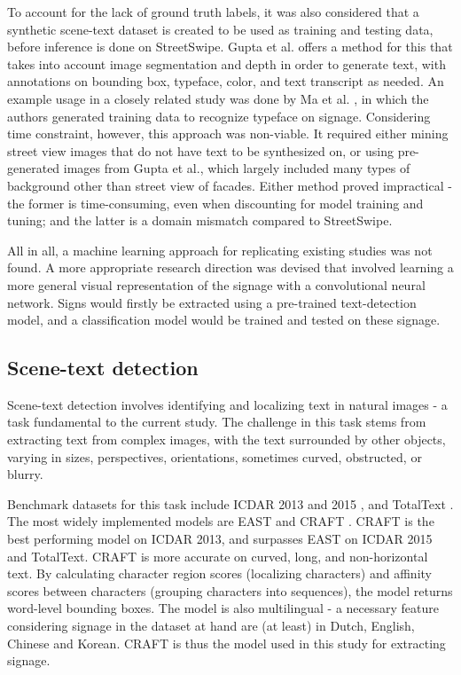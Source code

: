 To account for the lack of ground truth labels, it was also considered that a synthetic scene-text dataset is created to be used as training and testing data, before inference is done on StreetSwipe. Gupta et al. \cite{gupta_synt_2016} offers a method for this that takes into account image segmentation and depth in order to generate text, with annotations on bounding box, typeface, color, and text transcript as needed. An example usage in a closely related study was done by Ma et al. \cite{ma_typef_2019}, in which the authors generated training data to recognize typeface on signage. Considering time constraint, however, this approach was non-viable. It required either mining street view images that do not have text to be synthesized on, or using pre-generated images from Gupta et al., which largely included many types of background other than street view of facades. Either method proved impractical - the former is time-consuming, even when discounting for model training and tuning; and the latter is a domain mismatch compared to StreetSwipe.

All in all, a machine learning approach for replicating existing studies was not found. A more appropriate research direction was devised that involved learning a more general visual representation of the signage with a convolutional neural network. Signs would firstly be extracted using a pre-trained text-detection model, and a classification model would be trained and tested on these signage.

\subsection{Scene-text detection}
Scene-text detection involves identifying and localizing text in natural images - a task fundamental to the current study. The challenge in this task stems from extracting text from complex images, with the text surrounded by other objects, varying in sizes, perspectives, orientations, sometimes curved, obstructed, or blurry.

Benchmark datasets for this task include ICDAR 2013 \cite{icdar13} and 2015 \cite{icdar15}, and TotalText \cite{totaltext}. The most widely implemented models are EAST \cite{zhou_east_2017} and CRAFT \cite{baek_character_2019}. CRAFT is the best performing model on ICDAR 2013, and surpasses EAST on ICDAR 2015 and TotalText. CRAFT is more accurate on curved, long, and non-horizontal text. By calculating character region scores (localizing characters) and affinity scores between characters (grouping characters into sequences), the model returns word-level bounding boxes. The model is also multilingual - a necessary feature considering signage in the dataset at hand are (at least) in Dutch, English, Chinese and Korean. CRAFT is thus the model used in this study for extracting signage.

